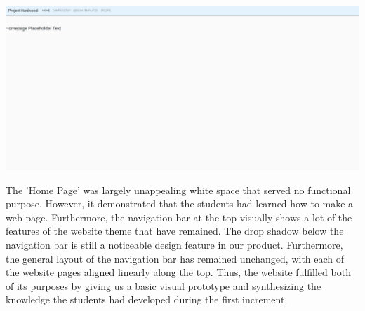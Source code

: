 \documentclass[openright]{report}
\begin{document}
\begin{center}
    \includegraphics[scale=0.36]{images/homepage1.png}
\end{center}

\par The 'Home Page' was largely unappealing white space that served no functional purpose. However, it demonstrated that the students had learned how to make a web page. Furthermore, the navigation bar at the top visually shows a lot of the features of the website theme that have remained. The drop shadow below the navigation bar is still a noticeable design feature in our product. Furthermore, the general layout of the navigation bar has remained unchanged, with each of the website pages aligned linearly along the top. Thus, the website fulfilled both of its purposes by giving us a basic visual prototype and synthesizing the knowledge the students had developed during the first increment.
\end{document}
